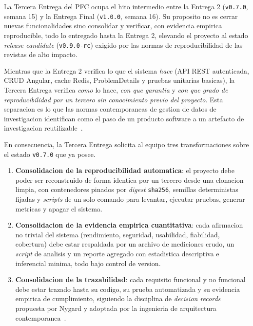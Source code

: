 \documentclass[11pt,a4paper]{article}
\begin{document}
La Tercera Entrega del PFC ocupa el hito intermedio entre la Entrega 2 (\texttt{v0.7.0}, semana 15) y la Entrega Final (\texttt{v1.0.0}, semana 16). Su proposito no es cerrar nuevas funcionalidades sino consolidar y verificar, con evidencia empirica reproducible, todo lo entregado hasta la Entrega 2, elevando el proyecto al estado \emph{release candidate} (\texttt{v0.9.0-rc}) exigido por las normas de reproducibilidad de las revistas de alto impacto.

Mientras que la Entrega 2 verifica lo que el sistema \emph{hace} (API REST autenticada, CRUD Angular, cache Redis, ProblemDetails y pruebas unitarias basicas), la Tercera Entrega verifica \emph{como} lo hace, \emph{con que garantia} y \emph{con que grado de reproducibilidad por un tercero sin conocimiento previo del proyecto}. Esta separacion es lo que las normas contemporaneas de gestion de datos de investigacion identifican como el paso de un producto software a un artefacto de investigacion reutilizable~\cite{wilkinson2016fair,acm2020artifact}.

En consecuencia, la Tercera Entrega solicita al equipo tres transformaciones sobre el estado \texttt{v0.7.0} que ya posee.

\begin{enumerate}
    \item \textbf{Consolidacion de la reproducibilidad automatica}: el proyecto debe poder ser reconstruido de forma identica por un tercero desde una clonacion limpia, con contenedores pinados por \emph{digest} \texttt{sha256}, semillas deterministas fijadas y \emph{scripts} de un solo comando para levantar, ejecutar pruebas, generar metricas y apagar el sistema.
    \item \textbf{Consolidacion de la evidencia empirica cuantitativa}: cada afirmacion no trivial del sistema (rendimiento, seguridad, usabilidad, fiabilidad, cobertura) debe estar respaldada por un archivo de mediciones crudo, un \emph{script} de analisis y un reporte agregado con estadistica descriptiva e inferencial minima, todo bajo control de version.
    \item \textbf{Consolidacion de la trazabilidad}: cada requisito funcional y no funcional debe estar trazado hasta su codigo, su prueba automatizada y su evidencia empirica de cumplimiento, siguiendo la disciplina de \emph{decision records} propuesta por Nygard y adoptada por la ingenieria de arquitectura contemporanea~\cite{nygard2011adr,brown2023c4,bass2021software,richards2020fundamentals}.
\end{enumerate}
\end{document}

